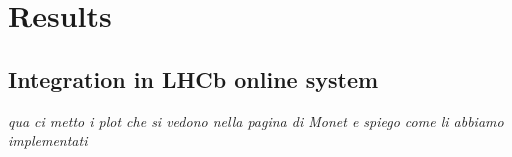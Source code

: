 
\chapter{Results}
\label{chp:results}
\section{Integration in LHCb online system}
\textit{qua ci metto i plot che si vedono nella pagina di Monet e spiego come li abbiamo implementati}
